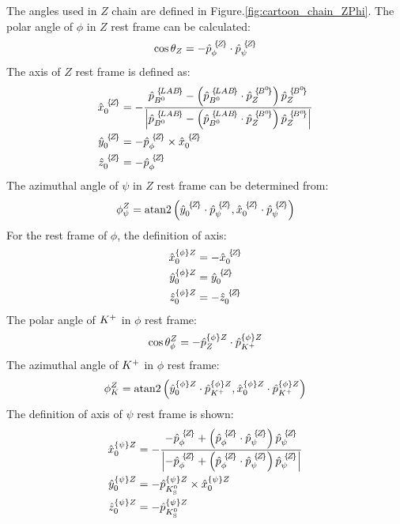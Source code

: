 The angles used in $Z$ chain are defined in Figure.\ref{fig:cartoon_chain_ZPhi}.
The polar angle of $\phi$ in $Z$ rest frame can be calculated:
\begin{equation}
\cos \theta_{Z} = -{\hat{p}}_{{\phi}}^{\,\,\{\!Z\!\}} \cdot {\hat{p}}_{{\psi}}^{\,\,\{\!Z\!\}}
\end{equation}
The axis of $Z$ rest frame is defined as: 
\begin{align}
\BA{\hat{x}}{0}{Z} & = - \frac{\BA{\hat{p}}{\Bz}{LAB} - \left(\BA{\hat{p}}{\Bz}{LAB} \cdot \BA{\hat{p}}{Z}{\Bz} \right) \BA{\hat{p}}{Z}{\Bz} }  
{\left|\BA{\hat{p}}{\Bz}{LAB} - \left(\BA{\hat{p}}{\Bz}{LAB} \cdot \BA{\hat{p}}{Z}{\Bz} \right) \BA{\hat{p}}{Z}{\Bz}\right|}\\
\BA{\hat{y}}{0}{Z} &= - \BA{\hat{p}}{\phi}{Z} \times \BA{\hat{x}}{0}{Z}\\
\BA{\hat{z}}{0}{Z} & = - \BA{\hat{p}}{\phi}{Z}
\end{align}
The azimuthal angle of $\psi$ in $Z$ rest frame can be determined from:
\begin{equation}
\phi_{\psi}^{Z} = \mathrm{atan2}  \left( \BA{\hat{y}}{0}{Z} \cdot \BA{\hat{p}}{\psi}{Z} , \BA{\hat{x}}{0}{Z} \cdot \BA{\hat{p}}{\psi}{Z} \right)
\end{equation}
For the rest frame of $\phi$, the definition of axis:
\begin{align}
{\hat{x}}_{0}^{\{\phi\}Z} & = - {\hat{x}}_{{0}}^{\,\,\{\!Z\!\}}\\
{\hat{y}}_{0}^{\{\phi\}Z} &= {\hat{y}}_{{0}}^{\,\,\{\!Z\!\}}\\
{\hat{z}}_{0}^{\{\phi\}Z} & = - {\hat{z}}_{{0}}^{\,\,\{\!Z\!\}}
\end{align}
The polar angle of ${{K}^+}$ in $\phi$ rest frame:
\begin{equation}
\cos \theta_{\phi}^{Z} = -{\hat{p}}_{Z}^{\{\phi\}Z} \cdot {\hat{p}}_{{{K}^+}}^{\{\phi\}Z}
\end{equation}
The azimuthal angle of ${{K}^+}$ in $\phi$ rest frame:
\begin{equation}
\phi_{K}^{Z} = \mathrm{atan2}  \left( {\hat{y}}_{0}^{\{\phi\}Z} \cdot {\hat{p}}_{{{K}^+}}^{\{\phi\}Z} , {\hat{x}}_{0}^{\{\phi\}Z} \cdot {\hat{p}}_{{{K}^+}}^{\{\phi\}Z} \right)
\end{equation}
The definition of axis of $\psi$ rest frame is shown:
\begin{align}
{\hat{x}}_{0}^{\{\psi\}Z} & = - \frac{- \BA{\hat{p}}{\phi}{Z} + \left(\BA{\hat{p}}{\phi}{Z} \cdot \BA{\hat{p}}{\psi}{Z} \right) \BA{\hat{p}}{\psi}{Z} }  
{\left| - \BA{\hat{p}}{\phi}{Z} + \left(\BA{\hat{p}}{\phi}{Z} \cdot \BA{\hat{p}}{\psi}{Z} \right) \BA{\hat{p}}{\psi}{Z} \right|}\\
{\hat{y}}_{0}^{\{\psi\}Z} &= - {\hat{p}}_{\KS}^{\{\psi\}Z} \times {\hat{x}}_{0}^{\{\psi\}\Z}\\
{\hat{z}}_{0}^{\{\psi\}Z} & = - {\hat{p}}_{\KS}^{\{\psi\}Z}
\end{align}
